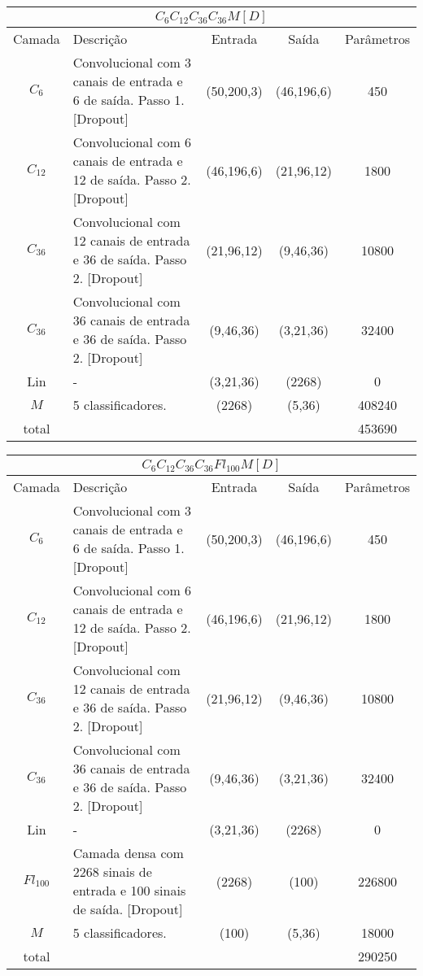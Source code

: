 \noindent
\begin{tabularx}{\linewidth}{ |c|X|c|c|c| }
	\multicolumn{5}{c}{$C_6C_{12}C_{36}C_{36}M[D]$} \\ \hline \hline
	Camada & Descrição & Entrada & Saída & Parâmetros \\ \hline
	$C_{6}$ & Convolucional com 3 canais de entrada e 6 de saída. Passo 1.  [Dropout] & (50,200,3) & (46,196,6) & 450 \\ \hline
	$C_{12}$ & Convolucional com 6 canais de entrada e 12 de saída. Passo 2.  [Dropout] & (46,196,6) & (21,96,12) & 1800 \\ \hline
	$C_{36}$ & Convolucional com 12 canais de entrada e 36 de saída. Passo 2.  [Dropout] & (21,96,12) & (9,46,36) & 10800 \\ \hline
	$C_{36}$ & Convolucional com 36 canais de entrada e 36 de saída. Passo 2.  [Dropout] & (9,46,36) & (3,21,36) & 32400 \\ \hline
	Lin & - & (3,21,36) & (2268) & 0 \\ \hline
	$M$ & 5 classificadores. & (2268) & (5,36) & 408240 \\ \hline
	total &  &  &  & 453690 \\ \hline
\end{tabularx}

\noindent
\begin{tabularx}{\linewidth}{ |c|X|c|c|c| }
	\multicolumn{5}{c}{$C_6C_{12}C_{36}C_{36}Fl_{100}M[D]$} \\ \hline \hline
	Camada & Descrição & Entrada & Saída & Parâmetros \\ \hline
	$C_{6}$ & Convolucional com 3 canais de entrada e 6 de saída. Passo 1.  [Dropout] & (50,200,3) & (46,196,6) & 450 \\ \hline
	$C_{12}$ & Convolucional com 6 canais de entrada e 12 de saída. Passo 2.  [Dropout] & (46,196,6) & (21,96,12) & 1800 \\ \hline
	$C_{36}$ & Convolucional com 12 canais de entrada e 36 de saída. Passo 2.  [Dropout] & (21,96,12) & (9,46,36) & 10800 \\ \hline
	$C_{36}$ & Convolucional com 36 canais de entrada e 36 de saída. Passo 2.  [Dropout] & (9,46,36) & (3,21,36) & 32400 \\ \hline
	Lin & - & (3,21,36) & (2268) & 0 \\ \hline
	$Fl_{100}$ & Camada densa com 2268 sinais de entrada e 100 sinais de saída.  [Dropout] & (2268) & (100) & 226800 \\ \hline
	$M$ & 5 classificadores. & (100) & (5,36) & 18000 \\ \hline
	total &  &  &  & 290250 \\ \hline
\end{tabularx}
